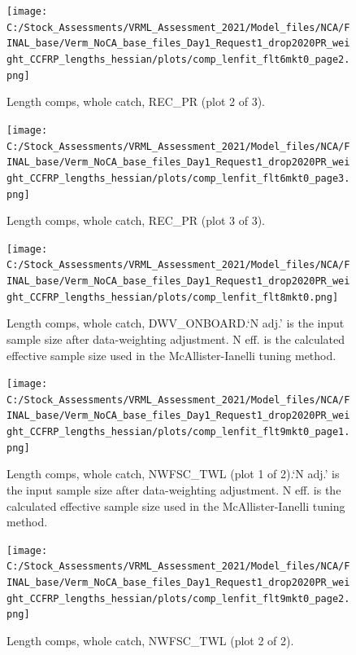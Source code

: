 \documentclass[11pt,
  english,
]{article}
\begin{document}
\begin{figure}
\centering
\texttt{[image: C:/Stock\_Assessments/VRML\_Assessment\_2021/Model\_files/NCA/FINAL\_base/Verm\_NoCA\_base\_files\_Day1\_Request1\_drop2020PR\_weight\_CCFRP\_lengths\_hessian/plots/comp\_lenfit\_flt6mkt0\_page2.png]}
\caption{Length comps, whole catch, REC\_PR (plot 2 of 3).\label{fig:comp_lenfit_flt6mkt0_page2}}
\end{figure}

\begin{figure}
\centering
\texttt{[image: C:/Stock\_Assessments/VRML\_Assessment\_2021/Model\_files/NCA/FINAL\_base/Verm\_NoCA\_base\_files\_Day1\_Request1\_drop2020PR\_weight\_CCFRP\_lengths\_hessian/plots/comp\_lenfit\_flt6mkt0\_page3.png]}
\caption{Length comps, whole catch, REC\_PR (plot 3 of 3).\label{fig:comp_lenfit_flt6mkt0_page3}}
\end{figure}

\begin{figure}
\centering
\texttt{[image: C:/Stock\_Assessments/VRML\_Assessment\_2021/Model\_files/NCA/FINAL\_base/Verm\_NoCA\_base\_files\_Day1\_Request1\_drop2020PR\_weight\_CCFRP\_lengths\_hessian/plots/comp\_lenfit\_flt8mkt0.png]}
\caption{Length comps, whole catch, DWV\_ONBOARD.`N adj.' is the input sample size after data-weighting adjustment. N eff. is the calculated effective sample size used in the McAllister-Ianelli tuning method.\label{fig:comp_lenfit_flt8mkt0}}
\end{figure}

\begin{figure}
\centering
\texttt{[image: C:/Stock\_Assessments/VRML\_Assessment\_2021/Model\_files/NCA/FINAL\_base/Verm\_NoCA\_base\_files\_Day1\_Request1\_drop2020PR\_weight\_CCFRP\_lengths\_hessian/plots/comp\_lenfit\_flt9mkt0\_page1.png]}
\caption{Length comps, whole catch, NWFSC\_TWL (plot 1 of 2).`N adj.' is the input sample size after data-weighting adjustment. N eff. is the calculated effective sample size used in the McAllister-Ianelli tuning method.\label{fig:comp_lenfit_flt9mkt0_page1}}
\end{figure}

\begin{figure}
\centering
\texttt{[image: C:/Stock\_Assessments/VRML\_Assessment\_2021/Model\_files/NCA/FINAL\_base/Verm\_NoCA\_base\_files\_Day1\_Request1\_drop2020PR\_weight\_CCFRP\_lengths\_hessian/plots/comp\_lenfit\_flt9mkt0\_page2.png]}
\caption{Length comps, whole catch, NWFSC\_TWL (plot 2 of 2).\label{fig:comp_lenfit_flt9mkt0_page2}}
\end{figure}
\end{document}
